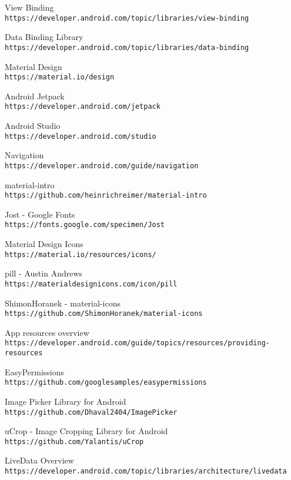 \documentclass[../TakeYourPill.tex]{subfiles}
\begin{document}
\renewcommand\bibname{Bibliografie}
\begin{thebibliography}{9}

View Binding
\\\texttt{https://developer.android.com/topic/libraries/view-binding}

Data Binding Library
\\\texttt{https://developer.android.com/topic/libraries/data-binding}

Material Design
\\\texttt{https://material.io/design}

Android Jetpack
\\\texttt{https://developer.android.com/jetpack}

Android Studio
\\\texttt{https://developer.android.com/studio}

Navigation
\\\texttt{https://developer.android.com/guide/navigation}


material-intro
\\\texttt{https://github.com/heinrichreimer/material-intro}

Jost - Google Fonts
\\\texttt{https://fonts.google.com/specimen/Jost}


Material Design Icons
\\\texttt{https://material.io/resources/icons/}

pill - Austin Andrews
\\\texttt{https://materialdesignicons.com/icon/pill}

ShimonHoranek - material-icons
\\\texttt{https://github.com/ShimonHoranek/material-icons}

App resources overview
\\\texttt{https://developer.android.com/guide/topics/resources/providing-resources}

EasyPermissions
\\\texttt{https://github.com/googlesamples/easypermissions}

Image Picker Library for Android
\\\texttt{https://github.com/Dhaval2404/ImagePicker}

uCrop - Image Cropping Library for Android
\\\texttt{https://github.com/Yalantis/uCrop}

LiveData Overview
\\\texttt{https://developer.android.com/topic/libraries/architecture/livedata}

\end{thebibliography}
\end{document}
